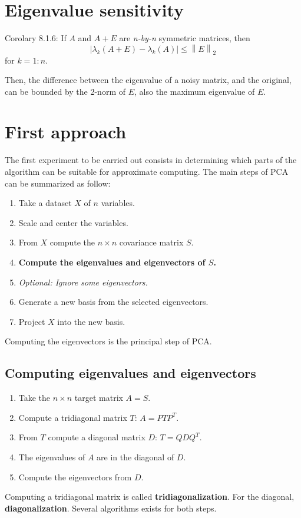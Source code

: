 \documentclass[11pt,a4paper]{article}
\newcommand{\norm}[1]{\left\lVert#1\right\rVert}
\begin{document}
\section{Eigenvalue sensitivity}


Corolary 8.1.6: If $A$ and $A+E$ are \textit{n-by-n} symmetric matrices, then
%
$$ |\lambda_k(A+E) - \lambda_k(A)| \le \norm{E}_2 $$
%
for $k = 1:n$.

Then, the difference between the eigenvalue of a noisy matrix, and the original, 
can be bounded by the 2-norm of $E$, also the maximum eigenvalue of $E$.

\section{First approach}

The first experiment to be carried out consists in determining which parts of 
the algorithm can be suitable for approximate computing. The main steps of PCA 
can be summarized as follow:
%
\begin{enumerate}
\item Take a dataset $X$ of $n$ variables.
\item Scale and center the variables.
\item From $X$ compute the $n\times n$ covariance matrix $S$.
\item \textbf{Compute the eigenvalues and eigenvectors of $S$.}
\item \textit{Optional: Ignore some eigenvectors.}
\item Generate a new basis from the selected eigenvectors.
\item Project $X$ into the new basis.
\end{enumerate}
%
Computing the eigenvectors is the principal step of PCA.

\subsection{Computing eigenvalues and eigenvectors}

\begin{enumerate}
\item Take the $n\times n$ target matrix $A = S$.
\item Compute a tridiagonal matrix $T$: $A = P T P^T$.
\item From $T$ compute a diagonal matrix $D$: $T = Q D Q^T$.
\item The eigenvalues of $A$ are in the diagonal of $D$.
\item Compute the eigenvectors from $D$.
\end{enumerate}
%
Computing a tridiagonal matrix is called \textbf{tridiagonalization}. For the 
diagonal, \textbf{diagonalization}. Several algorithms exists for both steps.
\end{document}

